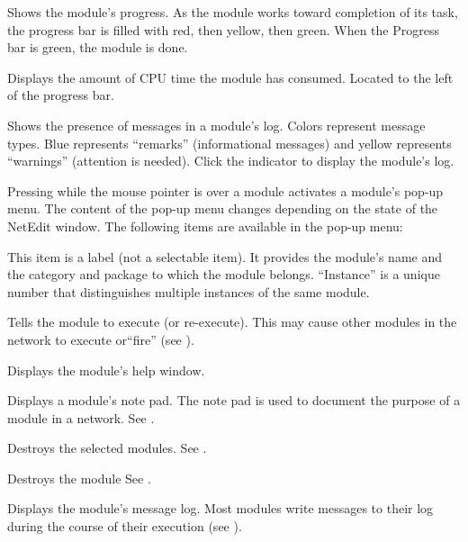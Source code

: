 \begin{description}
   Shows the module's progress.  As the module
  works toward completion of its task, the progress bar is filled
  with red, then yellow, then green.  When the Progress bar
  is green, the module is done.
  
   Displays the amount of CPU time the module has
  consumed.  Located to the left of the progress bar.
  
   Shows the presence of messages in a
  module's log.  Colors represent message types.  Blue represents
  ``remarks'' (informational messages) and yellow represents ``warnings''
  (attention is needed).  Click the indicator to display the
  module's log.
  
   Pressing  while the mouse pointer is
  over a module activates a module's pop-up menu.  The content
  of the pop-up menu changes depending on the state of the NetEdit
  window. The following items are available in the pop-up menu:

  \begin{description}
     This item is a
    label (not a selectable item).  It provides the module's name and
    the category and package to which the module belongs.
    ``Instance'' is a unique number that distinguishes multiple
    instances of the same module.
    
     Tells the module to execute (or
    re-execute).  This may cause other modules in the network to
    execute or``fire'' (see ).

     Displays the module's help window.
    
     Displays a module's note pad.  The note pad
    is used to document the purpose of a module in a network.  See
    .

     Destroys the selected modules.
    See .
    
     Destroys the module See .
    
     Displays the module's message log.  Most
    modules write messages to their log during the course of
    their execution (see ).
    

\end{description}
\end{description}
